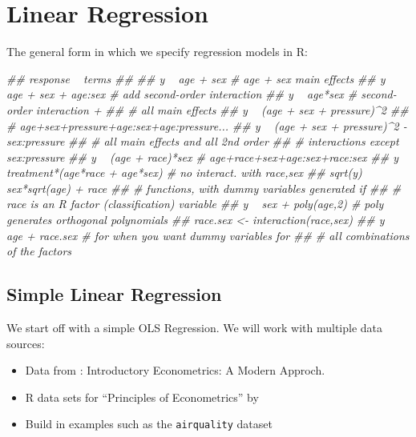 \documentclass[]{book}
\newenvironment{Shaded}{\begin{snugshade}}{\end{snugshade}}
\newcommand{\CommentTok}[1]{\textcolor[rgb]{0.56,0.35,0.01}{\textit{#1}}}
\providecommand{\tightlist}{%
  \setlength{\itemsep}{0pt}\setlength{\parskip}{0pt}}
\begin{document}
\hypertarget{linearregression}{%
\chapter{Linear Regression}\label{linearregression}}

The general form in which we specify regression models in R:

\begin{Shaded}
\begin{Highlighting}[]
\CommentTok{## response ~ terms}
\CommentTok{## }
\CommentTok{## y ~ age + sex            # age + sex main effects}
\CommentTok{## y ~ age + sex + age:sex  # add second-order interaction}
\CommentTok{## y ~ age*sex              # second-order interaction +}
\CommentTok{##                          # all main effects}
\CommentTok{## y ~ (age + sex + pressure)^2}
\CommentTok{##                          # age+sex+pressure+age:sex+age:pressure...}
\CommentTok{## y ~ (age + sex + pressure)^2 - sex:pressure}
\CommentTok{##                          # all main effects and all 2nd order}
\CommentTok{##                          # interactions except sex:pressure}
\CommentTok{## y ~ (age + race)*sex     # age+race+sex+age:sex+race:sex}
\CommentTok{## y ~ treatment*(age*race + age*sex) # no interact. with race,sex}
\CommentTok{## sqrt(y) ~ sex*sqrt(age) + race}
\CommentTok{## # functions, with dummy variables generated if}
\CommentTok{## # race is an R factor (classification) variable}
\CommentTok{## y ~ sex + poly(age,2)    # poly generates orthogonal polynomials}
\CommentTok{## race.sex <- interaction(race,sex)}
\CommentTok{## y ~ age + race.sex       # for when you want dummy variables for}
\CommentTok{##                          # all combinations of the factors}
\end{Highlighting}
\end{Shaded}

\hypertarget{simple-linear-regression}{%
\section{Simple Linear Regression}\label{simple-linear-regression}}

We start off with a simple OLS Regression. We will work with multiple
data sources:

\begin{itemize}
\tightlist
\item
  Data from \citet{wooldridge2015introductory} : Introductory
  Econometrics: A Modern Approch.
\item
  R data sets for ``Principles of Econometrics'' by
  \citet{hill2008principles}
\item
  Build in examples such as the \texttt{airquality} dataset
\end{itemize}
\end{document}
